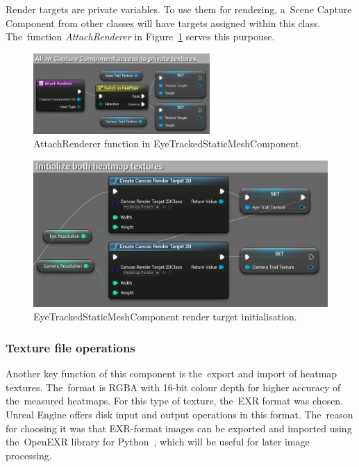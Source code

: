 Render targets are private variables. To use them for rendering, a~Scene Capture Component from other classes will have targets assigned within this class. The~function \emph{AttachRenderer} in Figure~\ref{fig:attach-renderer} serves this purpouse.

\begin{figure}[!ht]\centering
    \includegraphics[width=0.6\textwidth]{img/attach-renderer.png}
    \caption{AttachRenderer function in EyeTrackedStaticMeshComponent.}
    \label{fig:attach-renderer}
\end{figure}

\begin{figure}[!ht]
    \centering
    \includegraphics[width=\textwidth]{img/ETcomponent-init.png}
    \caption{EyeTrackedStaticMeshComponent render target initialisation.}
    \label{fig:RT-init}
\end{figure}

\pagebreak{}

\subsubsection*{Texture file operations}
Another key function of this component is the~export and import of heatmap textures. The~format is RGBA with 16-bit colour depth for higher accuracy of the~measured heatmaps. For this type of texture, the~EXR format was chosen. Unreal Engine offers disk input and output operations in this format. The~reason for choosing it was that EXR-format images can be exported and imported using the~OpenEXR library for Python~\cite{openexr}, which will be useful for later image processing.

